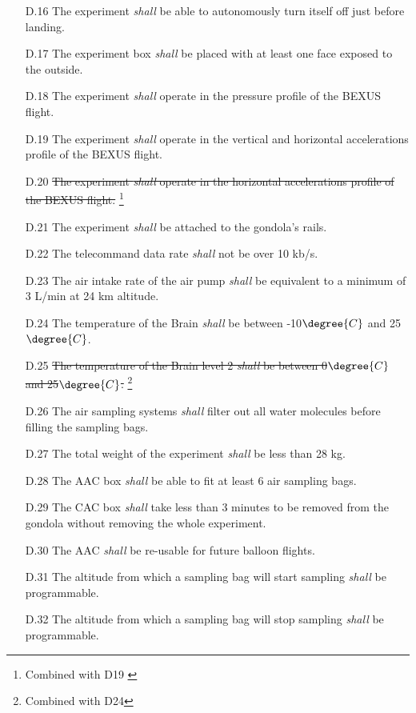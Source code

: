 \documentclass[a4paper,12pt,oneside]{article}
\begin{document}
\begin{appendices}
\begin{enumerate}
    \item[D.16] The experiment \textit{shall} be able to autonomously turn itself off just before landing.
    \item[D.17] The experiment box \textit{shall} be placed with at least one face exposed to the outside.
    \item[D.18] The experiment \textit{shall} operate in the pressure profile of the BEXUS flight\cite{BexusManual}.
    \item[D.19] The experiment \textit{shall} operate in the vertical and horizontal accelerations profile of the BEXUS flight\cite{BexusManual}.
    \item[D.20] \st{The experiment \textit{shall} operate in the
    horizontal accelerations profile of the BEXUS flight.} \cite{BexusManual} \footnote{Combined with D19 \label{fn:combi-d19}}
    \item[D.21] The experiment \textit{shall} be attached to the gondola's rails.
    \item[D.22] The telecommand data rate \textit{shall} not be over 10 kb/s.
    \item[D.23] The air intake rate of the air pump \textit{shall} be equivalent to a minimum of 3 L/min at 24 km altitude.
    \item[D.24] The temperature of the Brain \textit{shall} be between -10$\degree{C}$ and 25$\degree{C}$.
    \item[D.25] \st{The temperature of the Brain level 2 \textit{shall} be between 0$\degree{C}$ and 25$\degree{C}$.} \footnote{Combined with D24\label{fn:combi-d24}}
    \item[D.26] The air sampling systems \textit{shall} filter out all water molecules before filling the sampling bags.
    \item[D.27] The total weight of the experiment \textit{shall} be less than 28 kg.
    \item[D.28] The AAC box \textit{shall} be able to fit at least $6$ air sampling bags.
    \item[D.29] The CAC box \textit{shall} take less than 3 minutes to be removed from the gondola without removing the whole experiment.
    \item[D.30] The AAC \textit{shall} be re-usable for future balloon flights.
    \item[D.31] The altitude from which a sampling bag will start sampling \textit{shall} be programmable.
    \item[D.32] The altitude from which a sampling bag will stop sampling \textit{shall} be programmable.
\end{enumerate}


\end{appendices}
\end{document}
